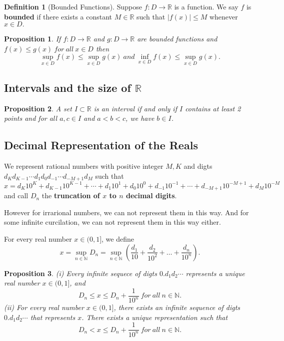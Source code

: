 \documentclass{article}
\newtheorem{proposition}{Proposition}[section]
\theoremstyle{definition}
\newtheorem{defi}{Definition}[section]
\begin{document}
\begin{defi}[Bounded Functions]
Suppose $f:D\rightarrow \mathbb{R}$ is a function. We say $f$ is \textbf{bounded} if there exists a constant $M\in \mathbb{R}$ such that $|f(x)|\leq M$ whenever $x\in D.$
\end{defi}

\begin{proposition}
If $f:D\rightarrow \mathbb{R}$ and $g:D\rightarrow \mathbb{R}$ are bounded functions and $f(x)\leq g(x)\ for\ all\ x\in D$
then
$$\sup_{x\in D}f(x)\leq \sup_{x\in D}g(x)\ and\ \inf_{x\in D}f(x)\leq\sup_{x\in D}g(x).$$
\end{proposition}

\subsection{Intervals and the size of $\mathbb{R}$}

\begin{proposition}
A set $I\subset \mathbb{R}$ is an interval if and only if $I$ contains at least 2 points and for all $a,c\in I$ and $a<b<c$, we have $b\in I$.
\end{proposition}

\subsection{Decimal Representation of the Reals}
We represent rational numbers with positive integer $M,K$ and digts $d_{K}d_{K-1}\cdots d_{1}d_{0}d_{-1}\cdots d_{-M+1}d_{M}$ such that 
$$x=d_{K}10^{K}+d_{K-1}10^{K-1}+\cdots +d_{1}10^{1}+d_{0}10^{0}+d_{-1}10^{-1}+\cdots +d_{-M+1}10^{-M+1}+d_{M}10^{-M}$$
and call $D_{n}$ the \textbf{truncation of $x$ to $n$ decimal digits}.

However for irrarional numbers, we can not represent them in this way. And for some infinite curcilation, we can not represent them in this way either.

For every real number $x\in(0,1]$, we define 
$$x=\sup_{n\in \mathbb{N}}D_{n}=\sup_{n\in \mathbb{N}}\left( \frac{d_{1}}{10}+ \frac{d_{2}}{10^{2}}+\dots +\frac{d_{n}}{10^{n}}\right).$$

\begin{proposition}
(i) Every infinite sequece of digts $0.d_{1}d_{2}\cdots$ represents a unique real number $x\in(0,1]$, and 
$$D_{n}\leq x\leq D_{n}+\frac{1}{10^{n}}\ for\ all\ n\in \mathbb{N}.$$
(ii) For every real number $x\in(0,1]$, there exists an infinite sequence of digts $0.d_{1}d_{2}\cdots$ that represents $x$. 
There exists a unique representation such that 
$$D_{n}< x\leq D_{n}+\frac{1}{10^{n}}\ for\ all\ n\in \mathbb{N}.$$
\end{proposition}
\end{document}
